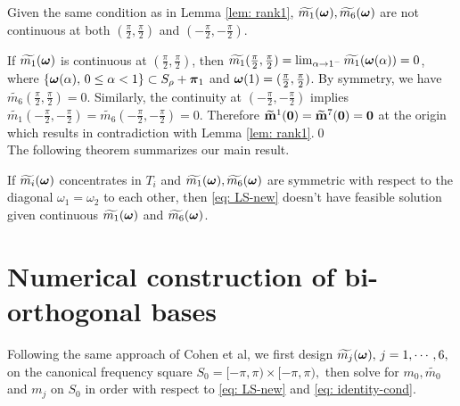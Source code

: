\begin{proposition}\label{prop: continuity}
Given the same condition as in Lemma \ref{lem: rank1}, $\widetilde{m_{1}}(\boldsymbol{\omega}),\widetilde{m_{6}}(\boldsymbol{\omega})$ are not continuous at both $(\frac{\pi}{2},\frac{\pi}{2})$ and $(-\frac{\pi}{2},-\frac{\pi}{2})$.
\end{proposition}
If $\widetilde{m_{1}}(\boldsymbol{\omega})$ is continuous at $(\frac{\pi}{2},\frac{\pi}{2})$, then $\widetilde{m_1}(\frac{\pi}{2},\frac{\pi}{2}) = \lim_{\alpha\rightarrow 1^-}\widetilde{m_1}(\boldsymbol{\omega}(\alpha)) = 0$, where $\{\boldsymbol{\omega}(\alpha),\,0\leq \alpha<1\} \subset S_\rho + \boldsymbol{\pi}_1$ and $\boldsymbol{\omega}(1) = (\frac{\pi}{2},\frac{\pi}{2})$. By symmetry, we have $\widetilde{m_6}(\frac{\pi}{2},\frac{\pi}{2}) = 0$. Similarly, the continuity at $(-\frac{\pi}{2},-\frac{\pi}{2})$ implies $\widetilde{m_1}(-\frac{\pi}{2},-\frac{\pi}{2}) = \widetilde{m_6}(-\frac{\pi}{2},-\frac{\pi}{2}) = 0$. Therefore $\widetilde{\mathbf{m}}^{1}(\boldsymbol{0}) = \widetilde{\mathbf{m}}^{7}(\boldsymbol{0}) = \mathbf{0}$ at the origin which results in contradiction with Lemma \ref{lem: rank1}.\qed\\[1em]%
The following theorem summarizes our main result.
\begin{theorem}\label{thm: thm}
If  $\widetilde{m_{i}}(\boldsymbol{\omega})$ concentrates in $T_i$ and $\widetilde{m_{1}}(\boldsymbol{\omega}),\widetilde{m_{6}}(\boldsymbol{\omega})$ are symmetric with respect to the diagonal $\omega_1=\omega_2$ to each other,  then  \eqref{eq: LS-new} doesn't have feasible solution given continuous $\widetilde{m_{1}}(\boldsymbol{\omega})$ and $\widetilde{m_{6}}(\boldsymbol{\omega})$.
\end{theorem}

\section{Numerical construction of bi-orthogonal bases}\label{sec: solve-quincunx}
Following the same approach of Cohen et al, we first design $\widetilde{m_{j}}(\boldsymbol{\omega}),\,j = 1,\cdots,6,$ on the canonical frequency square $S_0 = [-\pi,\pi)\times[-\pi,\pi),$ then solve for $m_0,\widetilde{m_0}$ and $m_j$ on $S_0$ in order with respect to \eqref{eq: LS-new} and \eqref{eq: identity-cond}.

